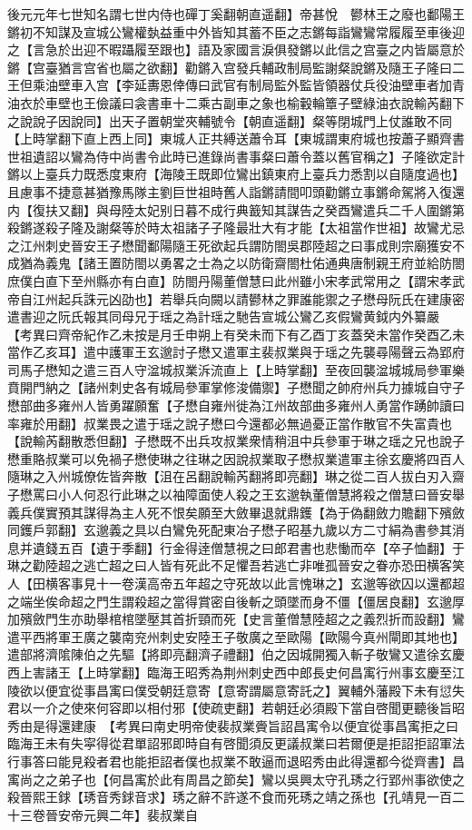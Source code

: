 後元元年七世知名謂七世内侍也磾丁奚翻朝直遥翻】帝甚悅　鬰林王之廢也鄱陽王鏘初不知謀及宣城公鸞權埶益重中外皆知其蓄不臣之志鏘每詣鸞鸞常履履至車後迎之【言急於出迎不暇躡履至跟也】語及家國言淚俱發鏘以此信之宫臺之内皆屬意於鏘【宫臺猶言宫省也屬之欲翻】勸鏘入宫發兵輔政制局監謝粲說鏘及隨王子隆曰二王但乘油壁車入宫【李延夀恩倖傳曰武官有制局監外監皆領器仗兵役油壁車者加青油衣於車壁也王儉議曰衾書車十二乘古副車之象也榆轂輪簟子壁綠油衣說輸芮翻下之說說子因說同】出天子置朝堂夾輔號令【朝直遥翻】粲等閉城門上仗誰敢不同【上時掌翻下直上西上同】東城人正共縛送蕭令耳【東城謂東府城也按蕭子顯齊書世祖遺詔以鸞為侍中尚書令此時已進錄尚書事粲曰蕭令蓋以舊官稱之】子隆欲定計鏘以上臺兵力既悉度東府【海陵王既即位鸞出鎮東府上臺兵力悉割以自隨度過也】且慮事不捷意甚猶豫馬隊主劉巨世祖時舊人詣鏘請間叩頭勸鏘立事鏘命駕將入復還内【復扶又翻】與母陸太妃别日暮不成行典籖知其謀告之癸酉鸞遣兵二千人圍鏘第殺鏘遂殺子隆及謝粲等於時太祖諸子子隆最壯大有才能【太祖當作世祖】故鸞尤忌之江州刺史晉安王子懋聞鄱陽隨王死欲起兵謂防閤吳郡陸超之曰事成則宗廟獲安不成猶為義鬼【諸王置防閤以勇畧之士為之以防衛齋閤杜佑通典唐制親王府並給防閤庶僕白直下至州縣亦有白直】防閤丹陽董僧慧曰此州雖小宋孝武常用之【謂宋孝武帝自江州起兵誅元凶劭也】若舉兵向闕以請鬰林之罪誰能禦之子懋母阮氏在建康密遣書迎之阮氏報其同母兄于瑶之為計瑶之馳告宣城公鸞乙亥假鸞黄鉞内外纂嚴　【考異曰齊帝紀作乙未按是月壬申朔上有癸未而下有乙酉丁亥蓋癸未當作癸酉乙未當作乙亥耳】遣中護軍王玄邈討子懋又遣軍主裴叔業與于瑶之先襲尋陽聲云為郢府司馬子懋知之遣三百人守湓城叔業泝流直上【上時掌翻】至夜回襲湓城城局參軍樂賁開門納之【諸州刺史各有城局參軍掌修浚備禦】子懋聞之帥府州兵力據城自守子懋部曲多雍州人皆勇躍願奮【子懋自雍州徙為江州故部曲多雍州人勇當作踴帥讀曰率雍於用翻】叔業畏之遣于瑶之說子懋曰今還都必無過憂正當作散官不失富貴也【說輸芮翻散悉但翻】子懋既不出兵攻叔業衆情稍沮中兵參軍于琳之瑶之兄也說子懋重賂叔業可以免禍子懋使琳之往琳之因說叔業取子懋叔業遣軍主徐玄慶將四百人隨琳之入州城僚佐皆奔散【沮在呂翻說輸芮翻將即亮翻】琳之從二百人拔白刃入齋子懋罵曰小人何忍行此琳之以袖障面使人殺之王玄邈執董僧慧將殺之僧慧曰晉安舉義兵僕實預其謀得為主人死不恨矣願至大斂畢退就鼎鑊【為于偽翻斂力贍翻下殯斂同鑊戶郭翻】玄邈義之具以白鸞免死配東冶子懋子昭基九歲以方二寸絹為書參其消息并遺錢五百【遺于季翻】行金得逹僧慧視之曰郎君書也悲慟而卒【卒子恤翻】于琳之勸陸超之逃亡超之曰人皆有死此不足懼吾若逃亡非唯孤晉安之眷亦恐田横客笑人【田横客事見十一卷漢高帝五年超之守死故以此言愧琳之】玄邈等欲囚以還都超之端坐俟命超之門生謂殺超之當得賞密自後斬之頭墜而身不僵【僵居良翻】玄邈厚加殯斂門生亦助舉棺棺墜壓其首折頸而死【史言董僧慧陸超之之義烈折而設翻】鸞遣平西將軍王廣之襲南兖州刺史安陸王子敬廣之至歐陽【歐陽今真州閘即其地也】遣部將濟隂陳伯之先驅【將即亮翻濟子禮翻】伯之因城開獨入斬子敬鸞又遣徐玄慶西上害諸王【上時掌翻】臨海王昭秀為荆州刺史西中郎長史何昌㝢行州事玄慶至江陵欲以便宜從事昌㝢曰僕受朝廷意寄【意寄謂屬意寄託之】翼輔外藩殿下未有愆失君以一介之使來何容即以相付邪【使疏吏翻】若朝廷必須殿下當自啓聞更聽後旨昭秀由是得還建康　【考異曰南史明帝使裴叔業賫旨詔昌㝢令以便宜從事昌㝢拒之曰臨海王未有失寜得從君單詔邪即時自有啓聞須反更議叔業曰若爾便是拒詔拒詔軍法行事答曰能見殺者君也能拒詔者僕也叔業不敢逼而退昭秀由此得還都今從齊書】昌㝢尚之之弟子也【何昌㝢於此有周昌之節矣】鸞以吳興太守孔琇之行郢州事欲使之殺晉熙王銶【琇音秀銶音求】琇之辭不許遂不食而死琇之靖之孫也【孔靖見一百二十三卷晉安帝元興二年】裴叔業自